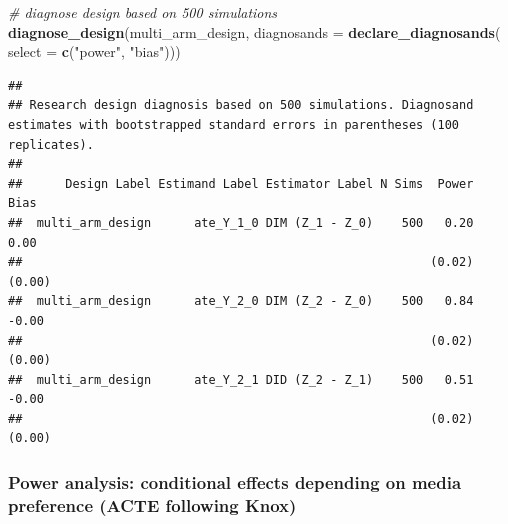 \documentclass[
]{article}
\newenvironment{Shaded}{\begin{snugshade}}{\end{snugshade}}
\newcommand{\CommentTok}[1]{\textcolor[rgb]{0.56,0.35,0.01}{\textit{#1}}}
\newcommand{\DataTypeTok}[1]{\textcolor[rgb]{0.13,0.29,0.53}{#1}}
\newcommand{\KeywordTok}[1]{\textcolor[rgb]{0.13,0.29,0.53}{\textbf{#1}}}
\newcommand{\NormalTok}[1]{#1}
\newcommand{\StringTok}[1]{\textcolor[rgb]{0.31,0.60,0.02}{#1}}
\begin{document}
\begin{Shaded}
\begin{Highlighting}[]
\CommentTok{\# diagnose design based on 500 simulations}
\KeywordTok{diagnose\_design}\NormalTok{(multi\_arm\_design, }\DataTypeTok{diagnosands =} \KeywordTok{declare\_diagnosands}\NormalTok{(}
  \DataTypeTok{select =} \KeywordTok{c}\NormalTok{(}\StringTok{"power"}\NormalTok{, }\StringTok{"bias"}\NormalTok{)))}
\end{Highlighting}
\end{Shaded}

\begin{verbatim}
## 
## Research design diagnosis based on 500 simulations. Diagnosand estimates with bootstrapped standard errors in parentheses (100 replicates).
## 
##      Design Label Estimand Label Estimator Label N Sims  Power   Bias
##  multi_arm_design      ate_Y_1_0 DIM (Z_1 - Z_0)    500   0.20   0.00
##                                                         (0.02) (0.00)
##  multi_arm_design      ate_Y_2_0 DIM (Z_2 - Z_0)    500   0.84  -0.00
##                                                         (0.02) (0.00)
##  multi_arm_design      ate_Y_2_1 DID (Z_2 - Z_1)    500   0.51  -0.00
##                                                         (0.02) (0.00)
\end{verbatim}

\hypertarget{power-analysis-conditional-effects-depending-on-media-preference-acte-following-knox}{%
\subsubsection{Power analysis: conditional effects depending on media
preference (ACTE following
Knox)}\label{power-analysis-conditional-effects-depending-on-media-preference-acte-following-knox}}
\end{document}
